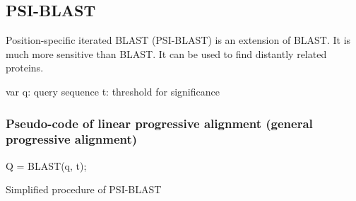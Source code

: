 %
%

%
%
\subsection{PSI-BLAST}
Position-specific iterated BLAST  (PSI-BLAST) is an extension of BLAST. It is much more sensitive than BLAST. It can be used to find distantly related proteins.

var
q: query sequence
t: threshold for significance

%
%
\subsubsection*{Pseudo-code of linear progressive alignment (general progressive alignment)}

\begin{algorithm}[H]
  
  \BlankLine
    
  
  \BlankLine \BlankLine
  
   Q = BLAST(q, t);

  \BlankLine \BlankLine


  \BlankLine   \BlankLine
  
  \caption{Simplified procedure of PSI-BLAST}

\end{algorithm}

\bigskip 

%
